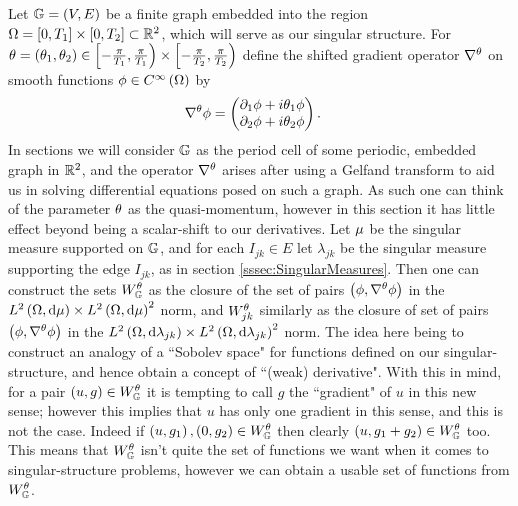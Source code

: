 Let $\mathbb{G}=\left( V,E \right)$ be a finite graph embedded into the region $\Omega=\left[ 0,T_1 \right]\times\left[ 0,T_2 \right]\subset\mathbb{R}^2$, which will serve as our singular structure.
For $\theta=\left( \theta_1,\theta_2 \right)\in\left[-\frac{\pi}{T_1},\frac{\pi}{T_1}\right)\times\left[-\frac{\pi}{T_2},\frac{\pi}{T_2}\right)$ define the shifted gradient operator $\nabla^{\theta}$ on smooth functions $\phi\in C^{\infty}\left( \Omega \right)$ by
\begin{align*}
	\nabla^{\theta}\phi &= \begin{pmatrix} \partial_1\phi + i\theta_1\phi \\ \partial_2\phi + i\theta_2\phi \end{pmatrix}.
\end{align*}
In sections  we will consider $\mathbb{G}$ as the period cell of some periodic, embedded graph in $\mathbb{R}^2$, and the operator $\nabla^{\theta}$ arises after using a Gelfand transform to aid us in solving differential equations posed on such a graph.
As such one can think of the parameter $\theta$ as the quasi-momentum, however in this section it has little effect beyond being a scalar-shift to our derivatives.
Let $\mu$ be the singular measure supported on $\mathbb{G}$, and for each $I_{jk}\in E$ let $\lambda_{jk}$ be the singular measure supporting the edge $I_{jk}$, as in section \ref{sssec:SingularMeasures}.
Then one can construct the sets $W^{\theta}_{\mathbb{G}}$ as the closure of the set of pairs $\left( \phi, \nabla^{\theta}\phi \right)$ in the $L^{2}\left( \Omega,\mathrm{d}\mu \right)\times L^{2}\left( \Omega,\mathrm{d}\mu \right)^2$ norm, and $W^{\theta}_{jk}$ similarly as the closure of set of pairs $\left( \phi, \nabla^{\theta}\phi \right)$ in the $L^{2}\left( \Omega,\mathrm{d}\lambda_{jk} \right)\times L^{2}\left( \Omega,\mathrm{d}\lambda_{jk} \right)^2$ norm.
The idea here being to construct an analogy of a ``Sobolev space" for functions defined on our singular-structure, and hence obtain a concept of ``(weak) derivative".
With this in mind, for a pair $\left( u,g \right)\in W^{\theta}_{\mathbb{G}}$ it is tempting to call $g$ the ``gradient" of $u$ in this new sense; however this implies that $u$ has only one gradient in this sense, and this is not the case.
Indeed if $\left( u,g_1 \right),\left( 0,g_2 \right)\in W^{\theta}_{\mathbb{G}}$ then clearly $\left( u, g_1+g_2 \right)\in W^{\theta}_{\mathbb{G}}$ too.
This means that $W^{\theta}_{\mathbb{G}}$ isn't quite the set of functions we want when it comes to singular-structure problems, however we can obtain a usable set of functions from $W^{\theta}_{\mathbb{G}}$. \newline

